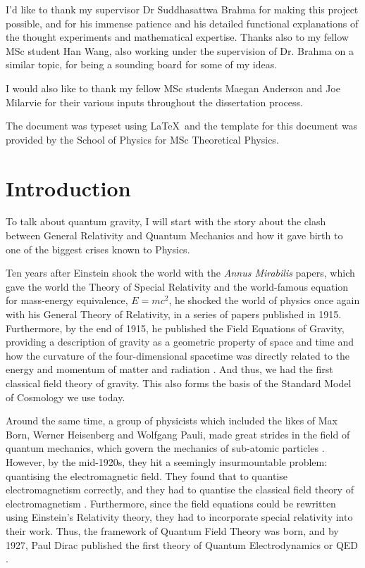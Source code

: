 \documentclass[12pt,a4paper]{report}
\theoremstyle{plain}
\theoremstyle{definition}
\theoremstyle{remark}
\begin{document}
I'd like to thank my supervisor Dr Suddhasattwa Brahma for
making this project possible, and for his immense patience and his detailed functional explanations of the thought experiments and mathematical expertise. Thanks also to my fellow MSc student Han Wang, also working under the supervision of Dr. Brahma on a similar topic, for being a sounding board for some of my ideas.

I would also like to thank my fellow MSc students Maegan Anderson and Joe Milarvie for their various inputs throughout the dissertation process.

The document was typeset using \LaTeX\ and the template for this document was provided by the School of Physics for MSc Theoretical Physics.

\newpage
\tableofcontents
\newpage
\listoffigures

\newpage
{}
\chapter{Introduction}

To talk about quantum gravity, I will start with the story about the clash between General Relativity and Quantum Mechanics and how it gave birth to one of the biggest crises known to Physics.

Ten years after Einstein shook the world with the \textit{Annus Mirabilis} papers, which gave the world the Theory of Special Relativity and the world-famous equation for mass-energy equivalence, $E = mc^2$, he shocked the world of physics once again with his General Theory of Relativity, in a series of papers published in 1915. Furthermore, by the end of 1915, he published the Field Equations of Gravity, providing a description of gravity as a geometric property of space and time and how the curvature of the four-dimensional spacetime was directly related to the energy and momentum of matter and radiation \cite{EinsteinFieldEq}. And thus, we had the first classical field theory of gravity. This also forms the basis of the Standard Model of Cosmology we use today.

Around the same time, a group of physicists which included the likes of Max Born, Werner Heisenberg and Wolfgang Pauli, made great strides in the field of quantum mechanics, which govern the mechanics of sub-atomic particles \cite{BornQM, BornHeisen}. However, by the mid-1920s, they hit a seemingly insurmountable problem: quantising the electromagnetic field. They found that to quantise electromagnetism correctly, and they had to quantise the classical field theory of electromagnetism \cite{PauliQE}. Furthermore, since the field equations could be rewritten using Einstein's Relativity theory, they had to incorporate special relativity into their work. Thus, the framework of Quantum Field Theory was born, and by 1927, Paul Dirac published the first theory of Quantum Electrodynamics or QED \cite{DiracFirstQED}. 
\end{document}
